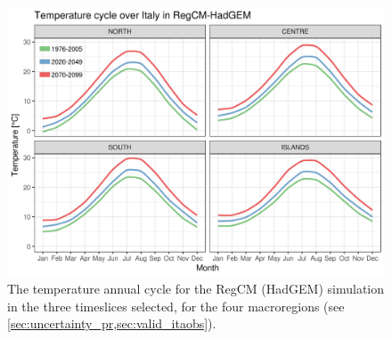 \begin{figure}
    \centering
    \includegraphics[width=\textwidth]{figures/change_rcm/tas/ac}
    \decoRule
    \caption[Future change in the temperature annual cycle]{
        The temperature annual cycle for the RegCM (HadGEM) simulation in the three timeslices selected, for the four macroregions (see \cref{sec:uncertainty_pr,sec:valid_itaobs}).
    }\label{fig:change_rcm_tas_ac}
\end{figure}
